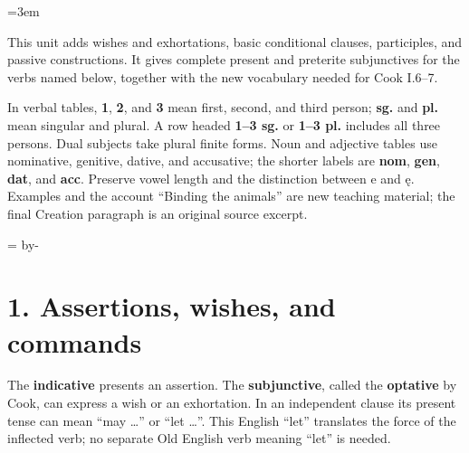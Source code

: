\newcommand{\runningtitle}{Unit 7. Subjunctive and passive}

\emergencystretch=3em
\newcommand{\itempara}[2]{\par\addvspace{3pt}\noindent\hangindent=1.8em\hangafter=1\makebox[1.8em][l]{#1.}#2\par}
\newcommand{\reserve}[1]{\par\penalty-100\begingroup\dimen0=\pagegoal\advance\dimen0 by-\pagetotal\ifdim\dimen0<#1\newpage\fi\endgroup}

\raggedright
{}

This unit adds wishes and exhortations, basic conditional clauses, participles, and passive constructions. It gives complete present and preterite subjunctives for the verbs named below, together with the new vocabulary needed for Cook I.6–7.

In verbal tables, \textbf{1}, \textbf{2}, and \textbf{3} mean first, second, and third person; \textbf{sg.} and \textbf{pl.} mean singular and plural. A row headed \textbf{1–3 sg.} or \textbf{1–3 pl.} includes all three persons. Dual subjects take plural finite forms. Noun and adjective tables use nominative, genitive, dative, and accusative; the shorter labels are \textbf{nom}, \textbf{gen}, \textbf{dat}, and \textbf{acc}. Preserve vowel length and the distinction between e and ę. Examples and the account “Binding the animals” are new teaching material; the final Creation paragraph is an original source excerpt.

\reserve{7\baselineskip}
\section*{1. Assertions, wishes, and commands}

The \textbf{indicative} presents an assertion. The \textbf{subjunctive}, called the \textbf{optative} by Cook, can express a wish or an exhortation. In an independent clause its present tense can mean “may …” or “let …”. This English “let” translates the force of the inflected verb; no separate Old English verb meaning “let” is needed.


